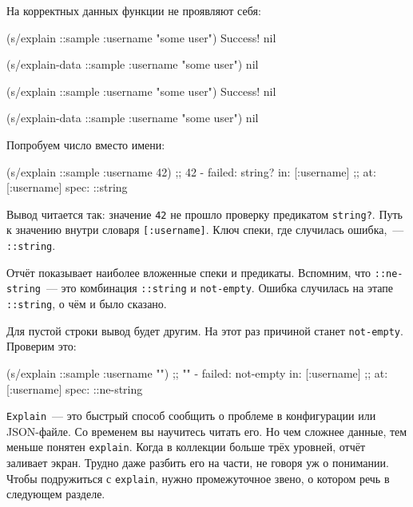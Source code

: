 \noindent
На корректных данных функции не проявляют себя:

\ifx\DEVICETYPE\MOBILE

\begin{english}
  \begin{clojure}
(s/explain ::sample
  {:username "some user"})
Success!
nil

(s/explain-data ::sample
  {:username "some user"})
nil
  \end{clojure}
\end{english}

\else

\begin{english}
  \begin{clojure}
(s/explain ::sample {:username "some user"})
Success!
nil

(s/explain-data ::sample {:username "some user"})
nil
  \end{clojure}
\end{english}

\fi

\noindent
Попробуем число вместо имени:

\begin{english}
  \begin{clojure}
(s/explain ::sample {:username 42})
;; 42 - failed: string? in: [:username]
;; at: [:username] spec: ::string
  \end{clojure}
\end{english}

Вывод читается так: значение \verb|42| не прошло проверку предикатом
\verb|string?|. Путь к значению внутри словаря \verb|[:username]|. Ключ
спеки, где случилась ошибка,~--- \verb|::string|.

Отчёт показывает наиболее вложенные спеки и предикаты. Вспомним, что
\verb|::ne-string|~--- это комбинация \verb|::string| и
\verb|not-empty|. Ошибка случилась на этапе \verb|::string|, о чём и было
сказано.

Для пустой строки вывод будет другим. На этот раз причиной станет
\verb|not-empty|. Проверим это:

\begin{english}
  \begin{clojure}
(s/explain ::sample {:username ""})
;; "" - failed: not-empty in: [:username]
;; at: [:username] spec: ::ne-string
  \end{clojure}
\end{english}

\verb|Explain|~--- это быстрый способ сообщить о проблеме в конфигурации или
JSON-файле. Со временем вы научитесь читать его. Но чем сложнее данные, тем
меньше понятен \verb|explain|. Когда в коллекции больше трёх уровней,
отчёт заливает экран. Трудно даже разбить его на части, не говоря уж о
понимании. Чтобы подружиться с \verb|explain|, нужно промежуточное звено, о
котором речь в следующем разделе.

